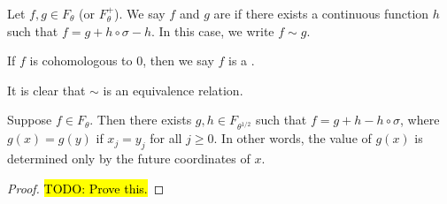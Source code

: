 \begin{definition}
	Let $f, g \in F_\theta$ (or $F_\theta^+$). We say $f$ and $g$ are  if there exists a continuous function $h$ such that $f = g + h \circ \sigma - h$. In this case, we write $f \sim g$.
	
	If $f$ is cohomologous to $0$, then we say $f$ is a .
\end{definition}

\begin{remark}
	It is clear that $\sim$ is an equivalence relation.
\end{remark}

\begin{proposition} \label{prop:pp-1-2}
	Suppose $f \in F_\theta$. Then there exists $g, h \in F_{\theta^{1 / 2}}$ such that $f = g + h - h \circ \sigma$, where $g(x) = g(y)$ if $x_j = y_j$ for all $j \geq 0$. In other words, the value of $g(x)$ is determined only by the future coordinates of $x$.
	\begin{proof}
		\hl{TODO: Prove this.}
	\end{proof}
\end{proposition}

\begin{comment}
If a function $f : \Sigma \to \complex$ is $\alpha$-H\"older continuous, $\alpha \in (0, 1]$, then it is a Lipschitz function with respect to $d_{\theta^\alpha}$.

Suppose we have $0 < \theta < \theta' < 1$. Then
\[
	F_{\theta'}(\Sigma) \supset F_\theta(\Sigma) \quad \text{and} \quad F_{\theta'}^+(\Sigma^+) \supset F_\theta^+(\Sigma^+).
\]
We can therefore define
\[
	F = \bigcup_{0 < \theta < 1}{F_\theta(\Sigma)} \quad \text{and} \quad F^+ = \bigcup_{0 < \theta < 1}{F_\theta^+(\Sigma^+)},
\]
the spaces of all H\"older continuous functions.


We now consider a class of functions lying in $F_\theta^+$ for all $0 < \theta < 1$. For all $m \geq 1$ we define
\[
	F_m^+ = \{f : \Sigma^+ \to \complex \mid f(x) = f(y) \text{ if } x_j = y_j, \text{ for all } 0 \leq j < m\},
\]
the set of all locally constant functions which depend on the first $m$ terms of $x \in \Sigma^+$. It is clear that
\[
	F_1^+ \subset F_2^+ \subset F_3^+ \subset \dots.
\]
and, for $f \in F_m^+$, $\var_m(f) = 0$. Hence
\[
	\bigcup_{m = 1}^\infty{F_m^+} \subset \bigcap_{0 < \theta < 1}{F_\theta^+}.
\]

\begin{proposition}
	Suppose $0 < \theta < \theta' < 1$. Then for all $m \geq 0$ we have
	\begin{equation*}
		|f - f_m|_{\theta'} \leq |f|_\theta \left(\frac{\theta}{\theta'}\right)^m.
	\end{equation*}
\end{proposition}
\end{comment}


